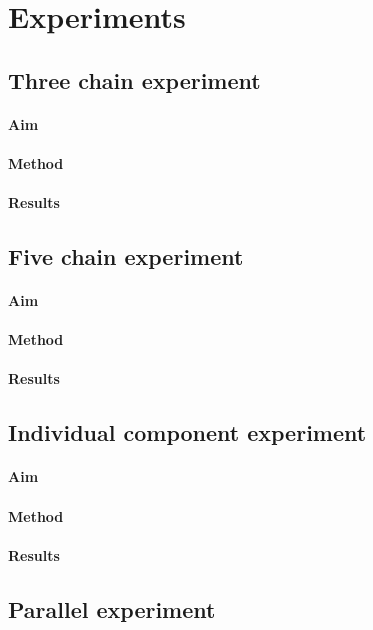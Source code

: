 \chapter{Experiments}
\label{chap:experiments}

\section{Three chain experiment}
\subsubsection{Aim}
\subsubsection{Method}
\subsubsection{Results}

\section{Five chain experiment}
\subsubsection{Aim}
\subsubsection{Method}
\subsubsection{Results}

\section{Individual component experiment}
\subsubsection{Aim}
\subsubsection{Method}
\subsubsection{Results}

\section{Parallel experiment}
